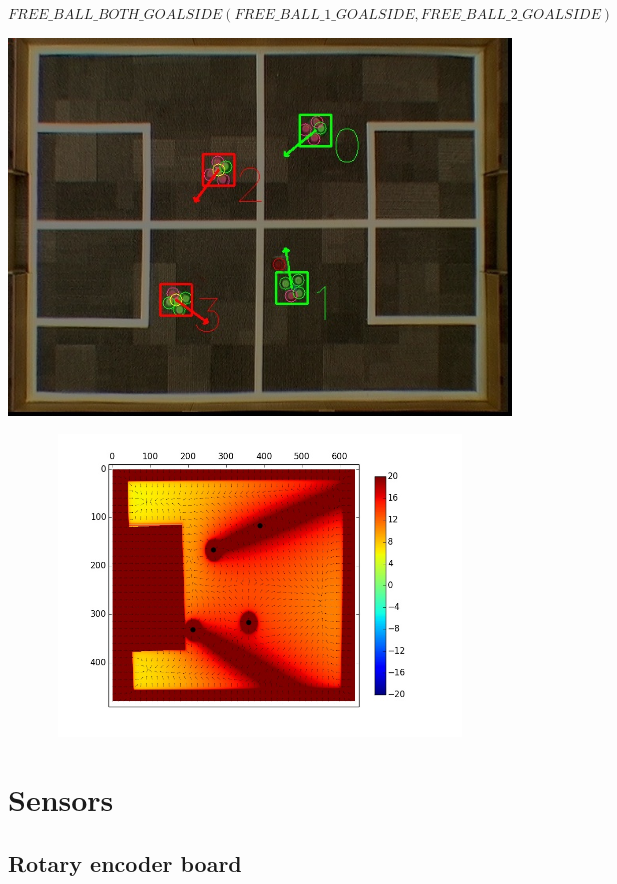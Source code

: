 \documentclass[a4paper,12pt]{article}
\begin{document}
$FREE\_BALL\_BOTH\_GOALSIDE (FREE\_BALL\_1\_GOALSIDE, FREE\_BALL\_2\_GOALSIDE)$ \newline \newline
\begin{minipage}{0.4\textwidth}
\includegraphics[scale=0.3]{v5.jpg}
\end{minipage}
\begin{minipage}{0.4\textwidth}
\includegraphics[height=80mm,width=135mm]{p5.jpg}
\end{minipage}\newline\newline
 

\section{Sensors}
\subsection{Rotary encoder board}
\end{document}

